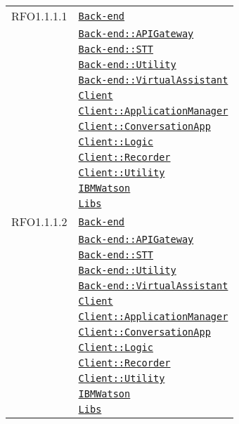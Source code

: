 \begin{longtable}{|>{\centering}m{3cm}|m{10cm}<{\centering}|}
RFO1.1.1.1 & \hyperref[Back-end]{\texttt{Back-end}}\\
& \hyperref[Back-end::APIGateway]{\texttt{Back-end::APIGateway}}\\
& \hyperref[Back-end::STT]{\texttt{Back-end::STT}}\\
& \hyperref[Back-end::Utility]{\texttt{Back-end::Utility}}\\
& \hyperref[Back-end::VirtualAssistant]{\texttt{Back-end::VirtualAssistant}}\\
& \hyperref[Client]{\texttt{Client}}\\
& \hyperref[Client::ApplicationManager]{\texttt{Client::ApplicationManager}}\\
& \hyperref[Client::ConversationApp]{\texttt{Client::ConversationApp}}\\
& \hyperref[Client::Logic]{\texttt{Client::Logic}}\\
& \hyperref[Client::Recorder]{\texttt{Client::Recorder}}\\
& \hyperref[Client::Utility]{\texttt{Client::Utility}}\\
& \hyperref[IBMWatson]{\texttt{IBMWatson}}\\
& \hyperref[Libs]{\texttt{Libs}}\\ \hline

RFO1.1.1.2 & \hyperref[Back-end]{\texttt{Back-end}}\\
& \hyperref[Back-end::APIGateway]{\texttt{Back-end::APIGateway}}\\
& \hyperref[Back-end::STT]{\texttt{Back-end::STT}}\\
& \hyperref[Back-end::Utility]{\texttt{Back-end::Utility}}\\
& \hyperref[Back-end::VirtualAssistant]{\texttt{Back-end::VirtualAssistant}}\\
& \hyperref[Client]{\texttt{Client}}\\
& \hyperref[Client::ApplicationManager]{\texttt{Client::ApplicationManager}}\\
& \hyperref[Client::ConversationApp]{\texttt{Client::ConversationApp}}\\
& \hyperref[Client::Logic]{\texttt{Client::Logic}}\\
& \hyperref[Client::Recorder]{\texttt{Client::Recorder}}\\
& \hyperref[Client::Utility]{\texttt{Client::Utility}}\\
& \hyperref[IBMWatson]{\texttt{IBMWatson}}\\
& \hyperref[Libs]{\texttt{Libs}}\\ \hline


\end{longtable}
